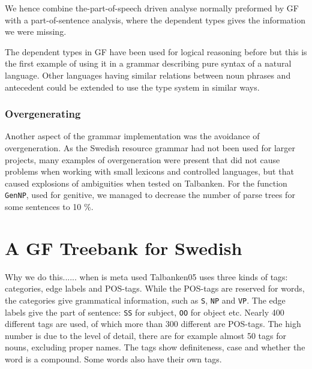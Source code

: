 \documentclass[runningheads,a4paper]{llncs}
\begin{document}
We hence combine the-part-of-speech driven analyse normally preformed by
GF with a part-of-sentence analysis, where the dependent types gives the 
information we were missing.

The dependent types in GF have been used for logical reasoning before but this 
is the first example of using it in a grammar describing pure syntax of
a natural language. Other languages having similar relations between 
noun phrases and antecedent could be extended to use the type system in similar
ways.

\subsubsection{Overgenerating}
Another aspect of the grammar implementation was the avoidance of overgeneration. As
the Swedish resource grammar had not been used for larger projects, many examples of
overgeneration were present that did not cause problems when working with small
lexicons and controlled languages, but that caused explosions of ambiguities when 
tested on Talbanken. For the function \verb-GenNP-, used for genitive, we managed
to decrease the number of parse trees for some sentences to 10 \%.


\section{A GF Treebank for Swedish}
\label{sec:mapping}

Why we do this...... when is meta used
Talbanken05 uses three kinds of tags: categories, edge labels and POS-tags. 
While the POS-tags are reserved for words, the categories give grammatical information,
such as \verb|S|, \verb|NP| and \verb|VP|.
The edge labels give the
part of sentence: \verb|SS| for subject, 
\verb|OO| for object etc. Nearly 400 different tags are used, of which more than
300 different are POS-tags. The high number is due to the level of detail,  there are for
example almost 50 tags for nouns, excluding proper names. The tags
show definiteness, case and whether the word is a compound. Some words also have
their own tags.\\
\end{document}
